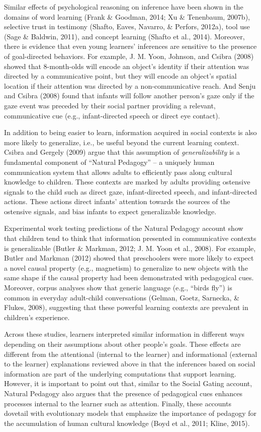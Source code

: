 \documentclass[english,floatsintext,man]{apa6}
\theoremstyle{definition}
\theoremstyle{definition}
\theoremstyle{definition}
\theoremstyle{remark}
\begin{document}
Similar effects of psychological reasoning on inference have been shown
in the domains of word learning (Frank \& Goodman, 2014; Xu \&
Tenenbaum, 2007b), selective trust in testimony (Shafto, Eaves, Navarro,
\& Perfors, 2012a), tool use (Sage \& Baldwin, 2011), and concept
learning (Shafto et al., 2014). Moreover, there is evidence that even
young learners' inferences are sensitive to the presence of
goal-directed behaviors. For example, J. M. Yoon, Johnson, and Csibra
(2008) showed that 8-month-olds will encode an object's identity if
their attention was directed by a communicative point, but they will
encode an object's spatial location if their attention was directed by a
non-communicative reach. And Senju and Csibra (2008) found that infants
will follow another person's gaze only if the gaze event was preceded by
their social partner providing a relevant, communicative cue (e.g.,
infant-directed speech or direct eye contact).

In addition to being easier to learn, information acquired in social
contexts is also more likely to generalize, i.e., be useful beyond the
current learning context. Csibra and Gergely (2009) argue that this
assumption of \emph{generalizability} is a fundamental component of
\enquote{Natural Pedagogy} -- a uniquely human communication system that
allows adults to efficiently pass along cultural knowledge to children.
These contexts are marked by adults providing ostensive signals to the
child such as direct gaze, infant-directed speech, and infant-directed
actions. These actions direct infants' attention towards the sources of
the ostensive signals, and bias infants to expect generalizable
knowledge.

Experimental work testing predictions of the Natural Pedagogy account
show that children tend to think that information presented in
communicative contexts is generalizable (Butler \& Markman, 2012; J. M.
Yoon et al., 2008). For example, Butler and Markman (2012) showed that
preschoolers were more likely to expect a novel causal property (e.g.,
magnetism) to generalize to new objects with the same shape if the
causal property had been demonstrated with pedagogical cues. Moreover,
corpus analyses show that generic language (e.g., \enquote{birds fly})
is common in everyday adult-child conversations (Gelman, Goetz,
Sarnecka, \& Flukes, 2008), suggesting that these powerful learning
contexts are prevalent in children's experience.

Across these studies, learners interpreted similar information in
different ways depending on their assumptions about other people's
goals. These effects are different from the attentional (internal to the
learner) and informational (external to the learner) explanations
reviewed above in that the inferences based on social information are
part of the underlying computations that support learning. However, it
is important to point out that, similar to the Social Gating account,
Natural Pedagogy also argues that the presence of pedagogical cues
enhances processes internal to the learner such as attention. Finally,
these accounts dovetail with evolutionary models that emphasize the
importance of pedagogy for the accumulation of human cultural knowledge
(Boyd et al., 2011; Kline, 2015).
\end{document}
